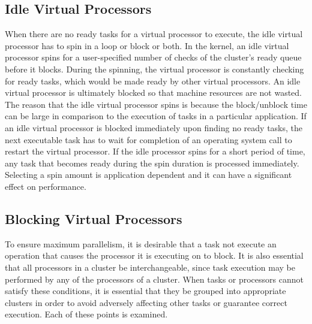 \documentclass[openright,twoside]{report}
\begin{document}
\subsection{Idle Virtual Processors}
\label{s:IdleVirtualProcessors}

When there are no ready tasks for a virtual processor to execute, the idle virtual processor has to spin in a loop or block or both.
In the \uC kernel, an idle virtual processor spins for a user-specified number of checks of the cluster's ready queue before it blocks.
During the spinning, the virtual processor is constantly checking for ready tasks, which would be made ready by other virtual processors.
An idle virtual processor is ultimately blocked so that machine resources are not wasted.
The reason that the idle virtual processor spins is because the block/unblock time can be large in comparison to the execution of tasks in a particular application.
If an idle virtual processor is blocked immediately upon finding no ready tasks, the next executable task has to wait for completion of an operating system call to restart the virtual processor.
If the idle processor spins for a short period of time, any task that becomes ready during the spin duration is processed immediately.
Selecting a spin amount is application dependent and it can have a significant effect on performance.


\subsection{Blocking Virtual Processors}
\label{s:BlockingVirtualProcessors}

To ensure maximum parallelism, it is desirable that a task not execute an operation that causes the processor it is executing on to block.
It is also essential that all processors in a cluster be interchangeable, since task execution may be performed by any of the processors of a cluster.
When tasks or processors cannot satisfy these conditions, it is essential that they be grouped into appropriate clusters in order to avoid adversely affecting other tasks or guarantee correct execution.
Each of these points is examined.
\end{document}
